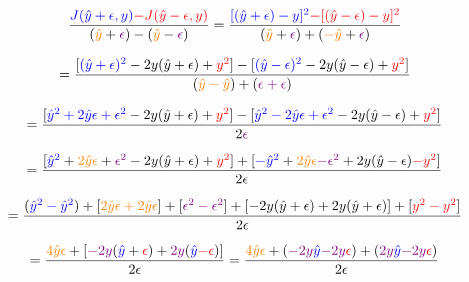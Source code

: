 \documentclass{article}
\begin{document}
\begin{displaymath}
\frac{\textcolor{blue}{J(\hat{y}+\epsilon, y)}
\textcolor{red}{-J(\hat{y}-\epsilon, y)}}
{(\textcolor{orange}{\hat{y}}+\textcolor{violet}{\epsilon})-(
\textcolor{orange}{\hat{y}}-\textcolor{violet}{\epsilon})}
=\frac{\textcolor{blue}{[(\hat{y}+\epsilon)-y]^2}
\textcolor{red}{-[(\hat{y}-\epsilon)-y]^2}}
{(\textcolor{orange}{\hat{y}}+\textcolor{violet}{\epsilon})+(
\textcolor{orange}{-\hat{y}}+\textcolor{violet}{\epsilon})}
\end{displaymath}

\begin{displaymath}
=\frac{[\textcolor{blue}{(\hat{y}+\epsilon)^2}-2y(\hat{y}+\epsilon)+
\textcolor{red}{y^2}]-[\textcolor{blue}{(\hat{y}-\epsilon)^2}
-2y(\hat{y}-\epsilon)+\textcolor{red}{y^2}]}
{(\textcolor{orange}{\hat{y}-\hat{y}})+(\textcolor{violet}{\epsilon+\epsilon})}
\end{displaymath}

\begin{displaymath}
=\frac{[\textcolor{blue}{\hat{y}^2+2\hat{y}\epsilon+\epsilon^2}
-2y(\hat{y}+\epsilon)+\textcolor{red}{y^2}]-
[\textcolor{blue}{\hat{y}^2-2\hat{y}\epsilon+\epsilon^2}
-2y(\hat{y}-\epsilon)+\textcolor{red}{y^2}]}
{2\textcolor{violet}{\epsilon}}
\end{displaymath}

\begin{displaymath}
=\frac{[\textcolor{blue}{\hat{y}^2}+\textcolor{orange}{2\hat{y}\epsilon}
+\textcolor{violet}{\epsilon^2}-2y(\hat{y}+\epsilon)+\textcolor{red}{y^2}]+
[\textcolor{blue}{-\hat{y}^2}+\textcolor{orange}{2\hat{y}\epsilon}
\textcolor{violet}{-\epsilon^2}+2y(\hat{y}-\epsilon)\textcolor{red}{-y^2}]}
{2\epsilon}
\end{displaymath}

\begin{displaymath}
=\frac{(\textcolor{blue}{\hat{y}^2-\hat{y}^2})+[
\textcolor{orange}{2\hat{y}\epsilon+2\hat{y}\epsilon}]+[
\textcolor{violet}{\epsilon^2-\epsilon^2}]+[
-2y(\hat{y}+\epsilon)+2y(\hat{y}+\epsilon)]+[\textcolor{red}{y^2-y^2}]}
{2\epsilon}
\end{displaymath}

\begin{displaymath}
=\frac{\textcolor{orange}{4\hat{y}\epsilon}+[\textcolor{violet}{-2y}
(\textcolor{blue}{\hat{y}}+\textcolor{red}{\epsilon})+\textcolor{violet}
{2y}(\textcolor{blue}{\hat{y}}\textcolor{red}{-\epsilon})]}
{2\epsilon}
=\frac{\textcolor{orange}{4\hat{y}\epsilon}+(\textcolor{violet}{-2y}
\textcolor{blue}{\hat{y}}\textcolor{violet}{-2y}
\textcolor{red}{\epsilon})+(\textcolor{violet}{2y}
\textcolor{blue}{\hat{y}}\textcolor{violet}{-2y}
\textcolor{red}{\epsilon})}{2\epsilon}
\end{displaymath}
\end{document}
